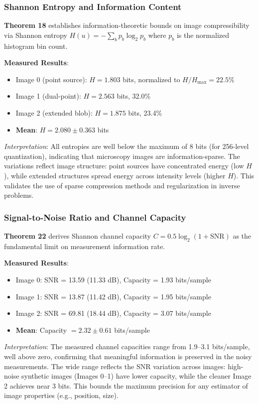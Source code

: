 \documentclass[twocolumn,11pt]{article}
\begin{document}
\subsubsection{Shannon Entropy and Information Content}

\textbf{Theorem 18} establishes information-theoretic bounds on image compressibility via Shannon entropy $H(u) = -\sum_b p_b \log_2 p_b$ where $p_b$ is the normalized histogram bin count.

\textbf{Measured Results}:
\begin{itemize}
\item Image 0 (point source): $H = 1.803$ bits, normalized to $H/H_{\max} = 22.5\%$
\item Image 1 (dual-point): $H = 2.563$ bits, 32.0\%
\item Image 2 (extended blob): $H = 1.875$ bits, 23.4\%
\item \textbf{Mean}: $H = 2.080 \pm 0.363$ bits
\end{itemize}

\textit{Interpretation}: All entropies are well below the maximum of 8 bits (for 256-level quantization), indicating that microscopy images are information-sparse. The variations reflect image structure: point sources have concentrated energy (low $H$), while extended structures spread energy across intensity levels (higher $H$). This validates the use of sparse compression methods and regularization in inverse problems.

\subsubsection{Signal-to-Noise Ratio and Channel Capacity}

\textbf{Theorem 22} derives Shannon channel capacity $C = 0.5 \log_2(1 + \text{SNR})$ as the fundamental limit on measurement information rate.

\textbf{Measured Results}:
\begin{itemize}
\item Image 0: SNR = 13.59 (11.33 dB), Capacity = 1.93 bits/sample
\item Image 1: SNR = 13.87 (11.42 dB), Capacity = 1.95 bits/sample
\item Image 2: SNR = 69.81 (18.44 dB), Capacity = 3.07 bits/sample
\item \textbf{Mean}: Capacity $= 2.32 \pm 0.61$ bits/sample
\end{itemize}

\textit{Interpretation}: The measured channel capacities range from 1.9--3.1 bits/sample, well above zero, confirming that meaningful information is preserved in the noisy measurements. The wide range reflects the SNR variation across images: high-noise synthetic images (Images 0--1) have lower capacity, while the cleaner Image 2 achieves near 3 bits. This bounds the maximum precision for any estimator of image properties (e.g., position, size).
\end{document}
